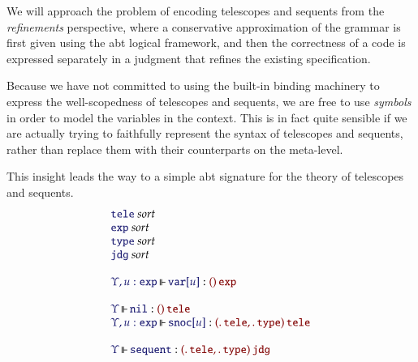 \documentclass[11pt]{article}
\theoremstyle{definition}
\theoremstyle{remark}
\numberwithin{equation}{section}
\def\IModeColorName{MidnightBlue}
\def\OModeColorName{Maroon}
\newcommand\IMode[1]{{\color{\IModeColorName}{#1}}}
\newcommand\OMode[1]{{\color{\OModeColorName}{#1}}}
\newcommand\MkValence[3]{%
  \ifthenelse{\equal{#1}{}}{}{%
    \{#1\}%
  }%
  \ifthenelse{\equal{#2}{}}{}{%
    [#2]%
  }.\, #3%
}
\newcommand\MkArity[2]{(#1)\, #2}
\newcommand\IsSort[1]{\IMode{#1}\ \textit{sort}}
\newcommand\IsOperator[3]{
  \IMode{#1}\,{\Vdash}\,\IMode{#2}: \OMode{#3}
}
\begin{document}
We will approach the problem of encoding telescopes and sequents from the
\emph{refinements} perspective, where a conservative approximation of the
grammar is first given using the abt logical framework, and then the correctness
of a code is expressed separately in a judgment that refines the existing
specification.

Because we have not committed to using the built-in binding machinery to express
the well-scopedness of telescopes and sequents, we are free to use
\emph{symbols} in order to model the variables in the context. This is in fact
quite sensible if we are actually trying to faithfully represent the syntax of
telescopes and sequents, rather than replace them with their counterparts on the
meta-level.

This insight leads the way to a simple abt signature for the theory of
telescopes and sequents.
%
\newcommand\SortTele{\mathtt{tele}}
\newcommand\SortJdg{\mathtt{jdg}}
\newcommand\SortType{\mathtt{type}}
\newcommand\SortExpr{\mathtt{exp}}
\newcommand\OpNil{\mathtt{nil}}
\newcommand\OpSnoc[1]{\mathtt{snoc}[#1]}
\newcommand\OpVar[1]{\mathtt{var}[#1]}
\newcommand\OpSequent{\mathtt{sequent}}
\[
  \begin{array}{l}
    \IsSort{\SortTele}\\
    \IsSort{\SortExpr}\\
    \IsSort{\SortType}\\
    \IsSort{\SortJdg}\\\\
    \IsOperator{\Upsilon, u:\SortExpr}{\OpVar{u}}{
      \MkArity{}{\SortExpr}
    }\\\\
    \IsOperator{\Upsilon}{\OpNil}{
      \MkArity{}{\SortTele}
    }\\
    \IsOperator{\Upsilon, u:\SortExpr}{\OpSnoc{u}}{
      \MkArity{
        \MkValence{}{}{\SortTele},
        \MkValence{}{}{\SortType}
      }{\SortTele}
    }\\\\
    \IsOperator{\Upsilon}{\OpSequent}{
      \MkArity{
        \MkValence{}{}{\SortTele},
        \MkValence{}{}{\SortType}
      }{\SortJdg}
    }
  \end{array}
\]

\newcommand\OpPi{\mathtt{pi}}
\newcommand\OpSg{\mathtt{sg}}
\newcommand\OpBool{\mathtt{bool}}
\newcommand\OpSo{\mathtt{isTrue}}
\end{document}
